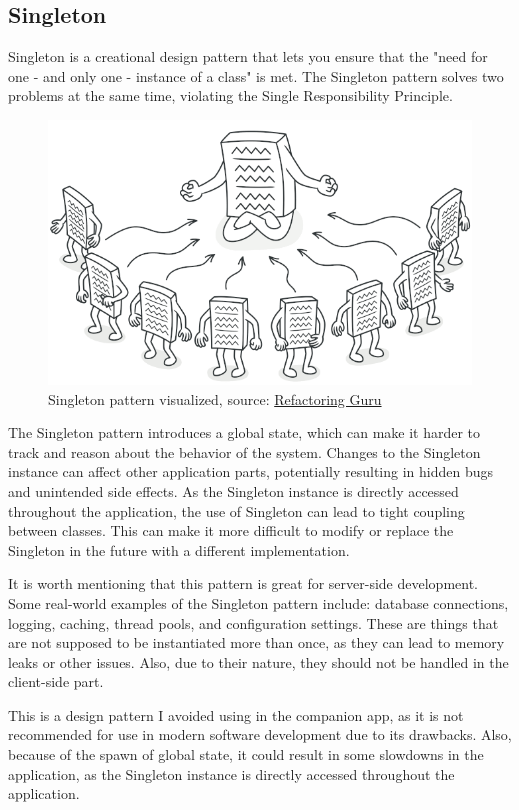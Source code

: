 \subsection{Singleton}
Singleton is a creational design pattern that lets you ensure that the "need for one - and only one - instance of a class" \cite{singletonQ} is met.
The Singleton pattern solves two problems at the same time, violating the Single Responsibility Principle.
\begin{figure}[htbp]
    \centering
    \includegraphics[scale=0.4]{pictures/singleton.png}
    \caption{Singleton pattern visualized, source: \href{https://rezababakhani.ir/blog/singleton-design-pattern}{Refactoring Guru}}
    \label{singletonExample}
\end{figure}
\par
The Singleton pattern introduces a global state, which can make it harder to track and reason about the behavior of the system.
Changes to the Singleton instance can affect other application parts, potentially resulting in hidden bugs and unintended side effects.
As the Singleton instance is directly accessed throughout the application, the use of Singleton can lead to tight coupling between classes. 
This can make it more difficult to modify or replace the Singleton in the future with a different implementation.
\par
It is worth mentioning that this pattern is great for server-side development.
Some real-world examples of the Singleton pattern include: database connections, logging, caching, thread pools, and configuration settings.
These are things that are not supposed to be instantiated more than once, as they can lead to memory leaks or other issues.
Also, due to their nature, they should not be handled in the client-side part.
\par
This is a design pattern I avoided using in the companion app, as it is not recommended for use in modern software development due to its drawbacks.
Also, because of the spawn of global state, it could result in some slowdowns in the application, as the Singleton instance is directly accessed throughout the application.


